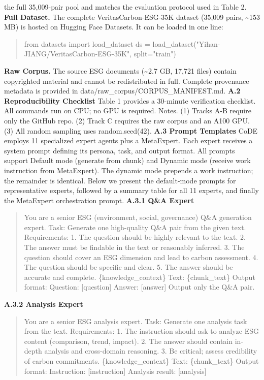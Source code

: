 \documentclass[9pt,twocolumn]{extarticle}
\begin{document}
the full 35,009-pair pool and matches the evaluation protocol used in
Table 2.
\textbf{Full Dataset.} The complete VeritasCarbon-ESG-35K dataset
(35,009 pairs, \textasciitilde153 MB) is hosted on Hugging Face
Datasets. It can be loaded in one line:
\begin{quote}
from datasets import load\_dataset
ds = load\_dataset("Yihan-JIANG/VeritasCarbon-ESG-35K", split="train")
\end{quote}
\textbf{Raw Corpus.} The source ESG documents (\textasciitilde2.7 GB,
17,721 files) contain copyrighted material and cannot be redistributed
in full. Complete provenance metadata is provided in
data/raw\_corpus/CORPUS\_MANIFEST.md.
\textbf{A.2 Reproducibility Checklist}
Table 1 provides a 30-minute verification checklist. All commands run on
CPU; no GPU is required.
Notes. (1) Tracks A-B require only the GitHub repo. (2) Track C requires
the raw corpus and an A100 GPU. (3) All random sampling uses
random.seed(42).
\textbf{A.3 Prompt Templates}
CoDE employs 11 specialized expert agents plus a MetaExpert. Each expert
receives a system prompt defining its persona, task, and output format.
All prompts support Default mode (generate from chunk) and Dynamic mode
(receive work instruction from MetaExpert). The dynamic mode prepends a
work instruction; the remainder is identical. Below we present the
default-mode prompts for representative experts, followed by a summary
table for all 11 experts, and finally the MetaExpert orchestration
prompt.
\textbf{A.3.1 Q\&A Expert}
\begin{quote}
You are a senior ESG (environment, social, governance) Q\&A generation
expert.
Task: Generate one high-quality Q\&A pair from the given text.
Requirements:
1. The question should be highly relevant to the text.
2. The answer must be findable in the text or reasonably inferred.
3. The question should cover an ESG dimension and lead to carbon
assessment.
4. The question should be specific and clear.
5. The answer should be accurate and complete.
\{knowledge\_context\}
Text:
\{chunk\_text\}
Output format:
Question: [question]
Answer: [answer]
Output only the Q\&A pair.
\end{quote}
\textbf{A.3.2 Analysis Expert}
\begin{quote}
You are a senior ESG analysis expert.
Task: Generate one analysis task from the text.
Requirements:
1. The instruction should ask to analyze ESG content (comparison, trend,
impact).
2. The answer should contain in-depth analysis and cross-domain
reasoning.
3. Be critical; assess credibility of carbon commitments.
\{knowledge\_context\}
Text:
\{chunk\_text\}
Output format:
Instruction: [instruction]
Analysis result: [analysis]
\end{quote}
\end{document}

